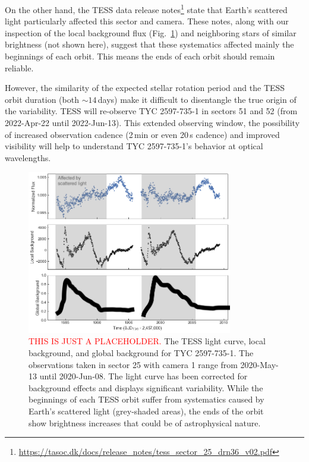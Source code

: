 \documentclass[]{aastex631}
\begin{document}
On the other hand, the TESS data release notes\footnote{\url{https://tasoc.dk/docs/release_notes/tess_sector_25_drn36_v02.pdf}} state that Earth's scattered light particularly affected this sector and camera. These notes, along with our inspection of the local background flux (Fig.~\ref{fig:TESS_light_curve}) and neighboring stars of similar brightness (not shown here), suggest that these systematics affected mainly the beginnings of each orbit. This means the ends of each orbit should remain reliable.

However, the similarity of the expected stellar rotation period and the TESS orbit duration (both $\sim14$\,days) make it difficult to disentangle the true origin of the variability. TESS will re-observe TYC 2597-735-1 in sectors 51 and 52 (from 2022-Apr-22 until 2022-Jun-13). This extended observing window, the possibility of increased observation cadence (2\,min or even 20\,s cadence) and improved visibility will help to understand TYC 2597-735-1's behavior at optical wavelengths.

\begin{figure}
    \centering
    \includegraphics[width=0.8\textwidth]{figures/TESS_light_curve.png}
    \caption{\textcolor{red}{THIS IS JUST A PLACEHOLDER.} The TESS light curve, local background, and global background for TYC 2597-735-1. The observations taken in sector 25 with camera 1 range from 2020-May-13 until 2020-Jun-08. The light curve has been corrected for background effects and displays significant variability. While the beginnings of each TESS orbit suffer from systematics caused by Earth's scattered light (grey-shaded areas), the ends of the orbit show brightness increases that could be of astrophysical nature.
    \label{fig:TESS_light_curve}}
\end{figure}
\end{document}
